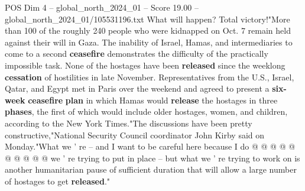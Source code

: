 \begin{textsample}{POS Dim 4 – global\_north\_2024\_01 – Score 19.00 – global\_north\_2024\_01/105531196.txt}
What will happen?
Total victory!"More than 100 of the roughly 240 people who were kidnapped on Oct. 7 remain held against their will in Gaza.
The inability of Israel, Hamas, and intermediaries to come to a second \textbf{ceasefire} demonstrates the difficulty of the practically impossible task.
None of the hostages have been \textbf{released} since the weeklong \textbf{cessation} of hostilities in late November.
Representatives from the U.S., Israel, Qatar, and Egypt met in Paris over the weekend and agreed to present a \textbf{six-week} \textbf{ceasefire} \textbf{plan} in which Hamas would \textbf{release} the hostages in three \textbf{phases}, the first of which would include older hostages, women, and children, according to the New York Times."The discussions have been pretty constructive,"National Security Council coordinator John Kirby said on Monday."What we ' re -- and I want to be careful here because I do @ @ @ @ @ @ @ @ @ @ we ' re trying to put in place -- but what we ' re trying to work on is another humanitarian pause of sufficient duration that will allow a large number of hostages to get \textbf{released}."

\end{textsample}
